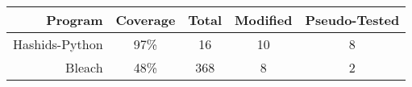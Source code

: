 \renewcommand{\arraystretch}{1.2}

\begin{table}[H]
\centering

\huge

\begin{tabular}{rcccc}


  Program & Coverage & Total & Modified & Pseudo-Tested \\
  \toprule

  Hashids-Python & 97\% & 16 & 10 & 8 \\

  Bleach & 48\% & 368 & 8 & 2 \\










\end{tabular}





\end{table}
